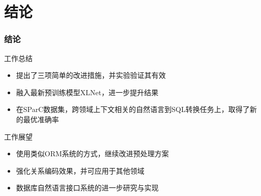 \documentclass{ctexbeamer}
\begin{document}
\section{结论}
\begin{frame}
  \frametitle{结论}
  \begin{block}{工作总结}
    \begin{itemize}
      \item 提出了三项简单的改进措施，并实验验证其有效
      \item 融入最新预训练模型XLNet，进一步提升结果
      \item 在SParC数据集，跨领域上下文相关的自然语言到SQL转换任务上，取得了新的最优准确率
    \end{itemize}
  \end{block}
  \begin{block}{工作展望}
    \begin{itemize}
      \item 使用类似ORM系统的方式，继续改进预处理方案
      \item 强化关系编码效果，并可应用于其他领域
      \item 数据库自然语言接口系统的进一步研究与实现
    \end{itemize}
  \end{block}
\end{frame}
\end{document}
